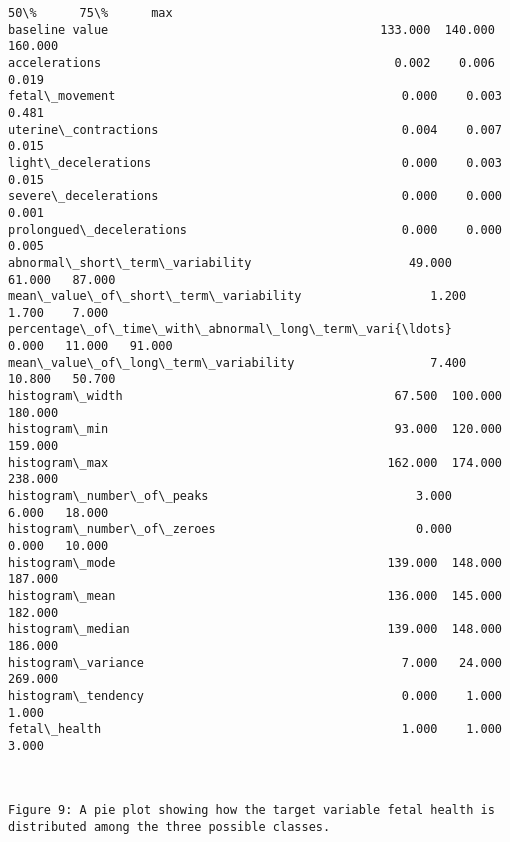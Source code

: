 \documentclass[11pt]{article}
\begin{document}
\begin{tcolorbox}[breakable, size=fbox, boxrule=.5pt, pad at break*=1mm, opacityfill=0]
\begin{Verbatim}[commandchars=\\\{\}]
                                                        50\%      75\%      max
baseline value                                      133.000  140.000  160.000
accelerations                                         0.002    0.006    0.019
fetal\_movement                                        0.000    0.003    0.481
uterine\_contractions                                  0.004    0.007    0.015
light\_decelerations                                   0.000    0.003    0.015
severe\_decelerations                                  0.000    0.000    0.001
prolongued\_decelerations                              0.000    0.000    0.005
abnormal\_short\_term\_variability                      49.000   61.000   87.000
mean\_value\_of\_short\_term\_variability                  1.200    1.700    7.000
percentage\_of\_time\_with\_abnormal\_long\_term\_vari{\ldots}    0.000   11.000   91.000
mean\_value\_of\_long\_term\_variability                   7.400   10.800   50.700
histogram\_width                                      67.500  100.000  180.000
histogram\_min                                        93.000  120.000  159.000
histogram\_max                                       162.000  174.000  238.000
histogram\_number\_of\_peaks                             3.000    6.000   18.000
histogram\_number\_of\_zeroes                            0.000    0.000   10.000
histogram\_mode                                      139.000  148.000  187.000
histogram\_mean                                      136.000  145.000  182.000
histogram\_median                                    139.000  148.000  186.000
histogram\_variance                                    7.000   24.000  269.000
histogram\_tendency                                    0.000    1.000    1.000
fetal\_health                                          1.000    1.000    3.000
\end{Verbatim}
\end{tcolorbox}

    \begin{center}
    \end{center}
    { \hspace*{\fill} \\}
    
    \begin{Verbatim}[commandchars=\\\{\}]
Figure 9: A pie plot showing how the target variable fetal health is
distributed among the three possible classes.
    \end{Verbatim}
\end{document}
